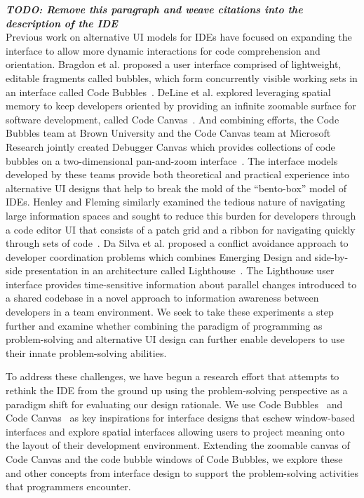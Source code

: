 \documentclass{ppig}
\newcommand{\todo}[1]{\textit{\textbf{\color{red}TODO: #1}}} %
\begin{document}
\todo{Remove this paragraph and weave citations into the description of the IDE}\\
Previous work on alternative UI models for IDEs have focused on expanding the interface to allow more dynamic interactions for code comprehension and orientation.
Bragdon et al. proposed a user interface comprised of lightweight, editable fragments called bubbles, which form concurrently visible working sets in an interface called Code Bubbles~\cite{bragdon2010bubbles}.
DeLine et al. explored leveraging spatial memory to keep developers oriented by providing an infinite zoomable surface for software development, called Code Canvas~\cite{deline2010canvas}.
And combining efforts, the Code Bubbles team at Brown University and the Code Canvas team at Microsoft Research jointly created Debugger Canvas which provides collections of code bubbles on a two-dimensional pan-and-zoom interface~\cite{deline2012debugger}.
The interface models developed by these teams provide both theoretical and practical experience into alternative UI designs that help to break the mold of the ``bento-box'' model of IDEs.
Henley and Fleming similarly examined the tedious nature of navigating large information spaces and sought to reduce this burden for developers through a code editor UI that consists of a patch grid and a ribbon for navigating quickly through sets of code~\cite{henley2014patchworks}.
Da Silva et al. proposed a conflict avoidance approach to developer coordination problems which combines Emerging Design and side-by-side presentation in an architecture called Lighthouse~\cite{dasilva2006lighthouse}.
The Lighthouse user interface provides time-sensitive information about parallel changes introduced to a shared codebase in a novel approach to information awareness between developers in a team environment.
We seek to take these experiments a step further and examine whether combining the paradigm of programming as problem-solving and alternative UI design can further enable developers to use their innate problem-solving abilities.

To address these challenges, we have begun a research effort that attempts to rethink the IDE from the ground up using the problem-solving perspective as a paradigm shift for evaluating our design rationale.
We use Code Bubbles~\cite{bragdon2010bubbles} and Code Canvas~\cite{deline2010canvas} as key inspirations for interface designs that eschew window-based interfaces and explore spatial interfaces allowing users to project meaning onto the layout of their development environment.
Extending the zoomable canvas of Code Canvas and the code bubble windows of Code Bubbles, we explore these and other concepts from interface design to support the problem-solving activities that programmers encounter.
\end{document}

